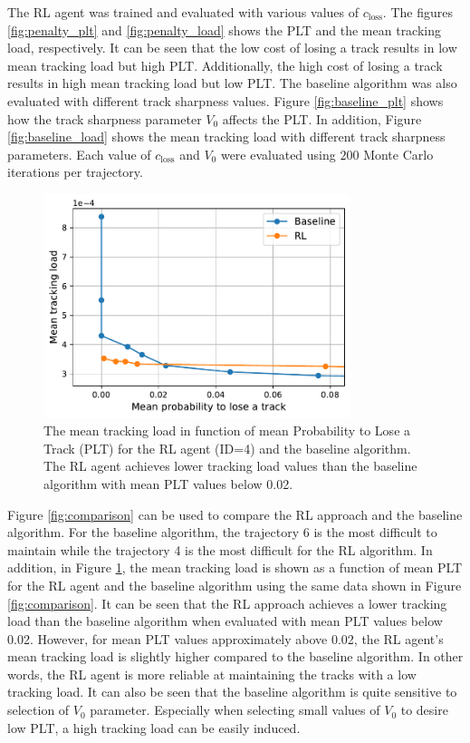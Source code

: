 \documentclass[english, 12pt, a4paper, elec, utf8, a-1b, online]{aaltothesis}
\numberwithin{equation}{section}
\newcommand{\closs}{c_\text{loss}}
\begin{document}
The RL agent was trained and evaluated with various values of $\closs$.
The figures \ref{fig:penalty_plt} and \ref{fig:penalty_load} shows the PLT and the mean tracking load, respectively.
It can be seen that the low cost of losing a track results in low mean tracking load but high PLT.
Additionally, the high cost of losing a track results in high mean tracking load but low PLT.
The baseline algorithm was also evaluated with different track sharpness values.
Figure \ref{fig:baseline_plt} shows how the track sharpness parameter $V_0$ affects the PLT.
In addition, Figure \ref{fig:baseline_load} shows the mean tracking load with different track sharpness parameters.
Each value of $\closs$ and $V_0$ were evaluated using $200$ Monte Carlo iterations per trajectory.

\begin{figure}
    \centering
    \includegraphics[width=0.8\textwidth]{figures/benchmark/Simulations/rl_baseline_comparison.pdf}
    \caption{The mean tracking load in function of mean Probability to Lose a Track (PLT) for the RL agent (ID=4) and the baseline algorithm. The RL agent achieves lower tracking load values than the baseline algorithm with mean PLT values below 0.02.}
    \label{fig:comparison_TL_PLT}
\end{figure}

Figure \ref{fig:comparison} can be used to compare the RL approach and the baseline algorithm.
For the baseline algorithm, the trajectory 6 is the most difficult to maintain while the trajectory 4 is the most difficult for the RL algorithm.
In addition, in Figure \ref{fig:comparison_TL_PLT}, the mean tracking load is shown as a function of mean PLT for the RL agent and the baseline algorithm using the same data shown in Figure \ref{fig:comparison}. 
It can be seen that the RL approach achieves a lower tracking load than the baseline algorithm when evaluated with mean PLT values below 0.02. 
However, for mean PLT values approximately above 0.02, the RL agent's mean tracking load is slightly higher compared to the baseline algorithm. 
In other words, the RL agent is more reliable at maintaining the tracks with a low tracking load. 
It can also be seen that the baseline algorithm is quite sensitive to selection of $V_0$ parameter. 
Especially when selecting small values of $V_0$ to desire low PLT, a high tracking load can be easily induced.
\end{document}
